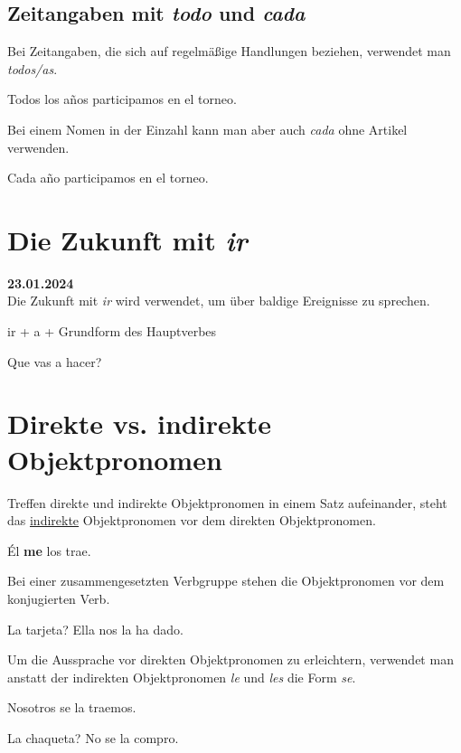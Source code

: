 \subsection*{Zeitangaben mit \textit{todo} und \textit{cada}}
Bei Zeitangaben, die sich auf regelmäßige Handlungen beziehen,
verwendet man \textit{todos/as}.
\begin{ejemplos}
    \item Todos los a\~nos participamos en el torneo.
\end{ejemplos}
Bei einem Nomen in der Einzahl kann man aber auch \textit{cada}
ohne Artikel verwenden.
\begin{ejemplos}
    \item Cada a\~no participamos en el torneo.
\end{ejemplos}
\section{Die Zukunft mit \textit{ir}}
\textbf{23.01.2024}\\
Die Zukunft mit \textit{ir} wird verwendet, um über
baldige Ereignisse zu sprechen.
\begin{gramatica}
    \item ir + a + Grundform des Hauptverbes
\end{gramatica}
\begin{ejemplos}
    \item Que vas a hacer?
\end{ejemplos}
\section{Direkte vs. indirekte Objektpronomen}
Treffen direkte und indirekte Objektpronomen in einem Satz
aufeinander, steht das \underline{indirekte} Objektpronomen
vor dem direkten Objektpronomen.
\begin{ejemplos}
    \item \'El \textbf{me} los trae.
\end{ejemplos}
Bei einer zusammengesetzten Verbgruppe stehen die Objektpronomen
vor dem konjugierten Verb.
\begin{ejemplos}
    \item La tarjeta? Ella nos la ha dado.
\end{ejemplos}
Um die Aussprache vor direkten Objektpronomen zu erleichtern,
verwendet man anstatt der indirekten Objektpronomen \textit{le} und
\textit{les} die Form \textit{se}.
\begin{ejemplos}
    \item Nosotros se la traemos.
    \item La chaqueta? No se la compro.
\end{ejemplos}
